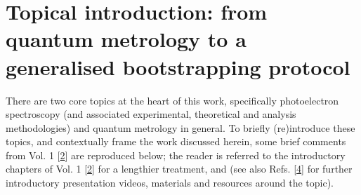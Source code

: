 \documentclass[letterpaper,table,10pt,english]{jupyterBook}
\begin{document}
\section{Topical introduction: from quantum metrology to a generalised bootstrapping protocol}
\label{\detokenize{part1/main_intro_060723:topical-introduction-from-quantum-metrology-to-a-generalised-bootstrapping-protocol}}\label{\detokenize{part1/main_intro_060723:sec-topical-intro}}
\sphinxAtStartPar
There are two core topics at the heart of this work, specifically photoelectron spectroscopy (and associated experimental, theoretical and analysis methodologies) and quantum metrology in general. To briefly (re)introduce these topics, and contextually frame the work discussed herein, some brief comments from  Vol. 1 {[}\hyperlink{cite.backmatter/bibliography:id663}{2}{]} are reproduced below; the reader is referred to the introductory chapters of  Vol. 1 {[}\hyperlink{cite.backmatter/bibliography:id663}{2}{]} for a lengthier treatment, and  (see also Refs. {[}\hyperlink{cite.backmatter/bibliography:id659}{4}{]} for further introductory presentation videos, materials and resources around the topic).
\end{document}
